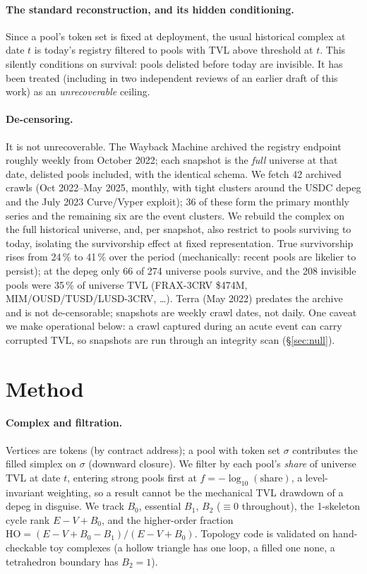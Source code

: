 \documentclass[10pt,twocolumn]{article}
\newcommand{\percent}{\%}
\newcommand{\num}[1]{#1}
\newcommand{\SI}[2]{#1\,#2}
\begin{document}
\paragraph{The standard reconstruction, and its hidden conditioning.} Since a pool's
token set is fixed at deployment, the usual historical complex at date $t$ is today's
registry filtered to pools with TVL above threshold at $t$. This silently conditions on
survival: pools delisted before today are invisible. It has been treated (including in two
independent reviews of an earlier draft of this work) as an \emph{unrecoverable} ceiling.

\paragraph{De-censoring.} It is not unrecoverable. The Wayback Machine archived the
registry endpoint roughly weekly from October 2022; each snapshot is the \emph{full}
universe at that date, delisted pools included, with the identical schema. We fetch
\num{42} archived crawls (Oct 2022--May 2025, monthly, with tight clusters around the
USDC depeg and the July 2023 Curve/Vyper exploit); \num{36} of these form the primary
monthly series and the remaining six are the event clusters. We rebuild the complex on the full
historical universe, and, per snapshot, also restrict to pools surviving to today,
isolating the survivorship effect at fixed representation. True survivorship rises from
\SI{24}{\percent} to \SI{41}{\percent} over the period (mechanically: recent pools are
likelier to persist); at the depeg only 66 of 274 universe pools survive, and the 208
invisible pools were \SI{35}{\percent} of universe TVL (FRAX-3CRV \$474M,
MIM/OUSD/TUSD/LUSD-3CRV, \ldots). Terra (May 2022) predates the archive and is not
de-censorable; snapshots are weekly crawl dates, not daily. One caveat we make operational
below: a crawl captured during an acute event can carry corrupted TVL, so snapshots are run
through an integrity scan (\S\ref{sec:null}).

\section{Method}
\label{sec:method}

\paragraph{Complex and filtration.} Vertices are tokens (by contract address); a pool with
token set $\sigma$ contributes the filled simplex on $\sigma$ (downward closure). We
filter by each pool's \emph{share} of universe TVL at date $t$, entering strong pools first
at $f=-\log_{10}(\text{share})$, a level-invariant weighting, so a result cannot be the
mechanical TVL drawdown of a depeg in disguise. We track $B_0$, essential $B_1$, $B_2$
($\equiv 0$ throughout), the 1-skeleton cycle rank $E-V+B_0$, and the higher-order
fraction $\text{HO} = (E-V+B_0-B_1)/(E-V+B_0)$. Topology code is validated on
hand-checkable toy complexes (a hollow triangle has one loop, a filled one none, a
tetrahedron boundary has $B_2=1$).
\end{document}
